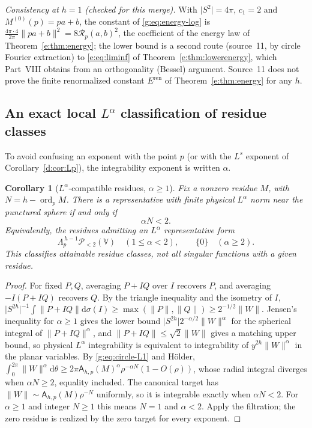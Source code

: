 \documentclass[11pt,a4paper]{article}
\numberwithin{equation}{section}
\newtheorem{corollary}[theorem]{Corollary}
\theoremstyle{definition}
\theoremstyle{remark}
\theoremstyle{plain}
\newcommand{\Rp}{\mathcal R_{p}}      %
\newcommand{\Eren}{E^{\mathrm{ren}}}
\newcommand{\abs}[1]{\lvert #1\rvert}
\newcommand{\norm}[1]{\lVert #1\rVert}
\newcommand{\dd}{\mathrm d}
\newcommand{\VV}{\mathbb V}                       %
\newcommand{\Pol}[1]{\mathscr P_{<#1}(\VV)}       %
\newcommand{\Rq}{\Lambda}                         %
\DeclareMathOperator{\ord}{ord}
\begin{document}
\emph{Consistency at $h=1$ (checked for this merge).} With $\abs{S^2}=4\pi$,
$c_1=2$ and $M^{(0)}(p)=pa+b$, the constant of \eqref{g:eq:energy-log} is
$\frac{4\pi\cdot4}{2\pi}\norm{pa+b}^2=8\Rp(a,b)^2$, the coefficient of the energy
law of Theorem~\ref{e:thm:energy}; the lower bound is a second route
(source~11, by circle Fourier extraction) to \eqref{e:eq:liminf} of
Theorem~\ref{e:thm:lowerenergy}, which Part~VIII obtains from an orthogonality
(Bessel) argument. Source~11 does not prove the finite renormalized constant
$\Eren$ of Theorem~\ref{e:thm:energy} for any $h$.

\subsection{An exact local $L^\alpha$ classification of residue classes}
\label{g:sub:Lalpha}

To avoid confusing an exponent with the point $p$ (or with the $L^s$ exponent
of Corollary~\ref{d:cor:Lp}), the integrability exponent is written $\alpha$.

\begin{corollary}[$L^\alpha$-compatible residues, $\alpha\ge1$]
\label{g:cor:Lalpha}
Fix a nonzero residue $M$, with $N=h-\ord_pM$. There is a representative with
finite physical $L^\alpha$ norm near the punctured sphere if and only if
\begin{equation}\label{g:eq:Lalpha-threshold}
 \alpha N<2 .
\end{equation}
Equivalently, the residues admitting an $L^\alpha$ representative form
\begin{equation}\label{g:eq:Lalpha-spaces}
 \Rq_p^{\,h-1}\Pol2\quad(1\le\alpha<2),\qquad \{0\}\quad(\alpha\ge2).
\end{equation}
This classifies attainable residue classes, not all singular functions with a
given residue.
\end{corollary}

\begin{proof}
For fixed $P,Q$, averaging $P+IQ$ over $I$ recovers $P$, and averaging
$-I(P+IQ)$ recovers $Q$. By the triangle inequality and the isometry of $I$,
$\abs{S^{2h}}^{-1}\int\norm{P+IQ}\dd\sigma(I)\ge\max(\norm P,\norm Q)
\ge2^{-1/2}\norm W$. Jensen's inequality for $\alpha\ge1$ gives the lower bound
$\abs{S^{2h}}2^{-\alpha/2}\norm W^\alpha$ for the spherical integral of
$\norm{P+IQ}^\alpha$, and $\norm{P+IQ}\le\sqrt2\norm W$ gives a matching upper
bound, so physical $L^\alpha$ integrability is equivalent to integrability of
$y^{2h}\norm W^\alpha$ in the planar variables. By \eqref{g:eq:circle-L1} and
H\"older, $\int_0^{2\pi}\norm W^\alpha\dd\theta\ge2\pi\mathsf A_{h,p}(M)^\alpha
\rho^{-\alpha N}(1-O(\rho))$, whose radial integral diverges when $\alpha N\ge2$,
equality included. The canonical target has $\norm W\sim\mathsf A_{h,p}(M)
\rho^{-N}$ uniformly, so it is integrable exactly when $\alpha N<2$. For
$\alpha\ge1$ and integer $N\ge1$ this means $N=1$ and $\alpha<2$. Apply the
filtration; the zero residue is realized by the zero target for every
exponent.
\end{proof}
\end{document}
